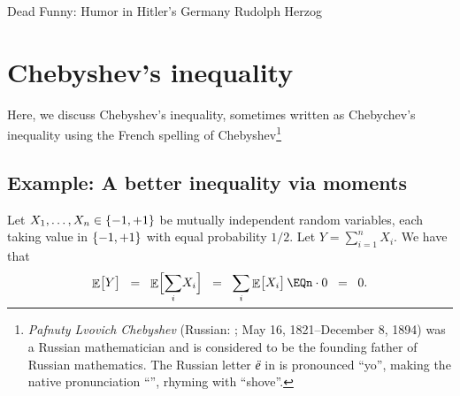 %



\ChapterPrefix{}
\ChapterGen{}

\medskip

%
{Dead Funny: Humor in Hitler's Germany}%
{Rudolph Herzog}




\section{Chebyshev's inequality}

Here, we discuss Chebyshev's inequality, sometimes written as Chebychev's
inequality using the French spelling of Chebyshev\footnote{\emph{Pafnuty
      Lvovich Chebyshev} (Russian: ; May 16, 1821--December 8, 1894) was a Russian
   mathematician and is considered to be the founding father of Russian
   mathematics. The Russian letter \emph{ё} in  is
   pronounced ``yo'', making the native pronunciation
   ``'', rhyming with ``shove''.}


\subsection{Example: A better inequality via moments}


Let $X_1, \ldots, X_n \in \left\{ {-1,+1} \right\}$ be mutually independent random variables,
each {taking value} in $\left\{ {-1,+1} \right\}$ with equal probability $1/2$. Let
$Y= \sum_{i=1}^n X_i$. We have that
\begin{equation*}
    \Ex{Y\bigr.}%
    \EQ%
    \Ex{\Bigl. \smash{\sum_i} X_i}%
    \EQ%
    \smash{\sum_i} \Ex{X_i \bigr.}%
    \EQ%
    n \cdot 0%
    \EQ
    0.
\end{equation*}

